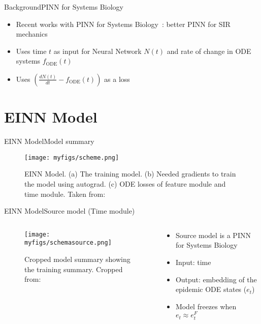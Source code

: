 \documentclass[
	aspectratio=169,	%
	onlytextwidth,		%
	t,					%
	]{beamer}
\begin{document}
\begin{frame}[fragile]{Background}{PINN for Systems Biology}

	\begin{itemize}

		\item<1-> Recent works with PINN for Systems Biology~\cite{yazdani, karnia}: better PINN for SIR mechanics 
		\item<2-> Uses time $t$ as input for Neural Network $N (t)$ and rate of change in ODE systems $f_{\text{ODE}} (t)$
		\item<3-> Uses $ (\frac{dN (t)}{dt}-f_{\text{ODE}} (t))$ as a loss
		
	\end{itemize}

\end{frame}

\section{EINN Model}

\begin{frame}[fragile]{EINN Model}{Model summary}

	\begin{figure}
		\texttt{[image: myfigs/scheme.png]}
		\caption{EINN Model. (a) The training model. (b) Needed gradients to train the model using autograd. (c) ODE losses of feature module and time module. Taken from:~\cite{main}}

	\end{figure}

\end{frame}

\begin{frame}[fragile]{EINN Model}{Source model (Time module)}
	\begin{columns}
		
		\begin{column}[T]{.5\textwidth}
			\begin{figure}
				\texttt{[image: myfigs/schemasource.png]}
				\caption{Cropped model summary showing the training summary. Cropped from:~\cite{main}}
			\end{figure}
		\end{column}
		
		\begin{column}[T]{.5\textwidth}
			\begin{itemize}
				\item<1-> Source model is a PINN for Systems Biology
				\item<2-> Input: time
				\item<3-> Output: embedding of the epidemic ODE states ($e_{t}$)
				\item<5-> Model freezes when $e_{t} \approx e_{t}^{F}$
			\end{itemize}
		\end{column}
			
\end{columns}
\end{frame}
\end{document}
